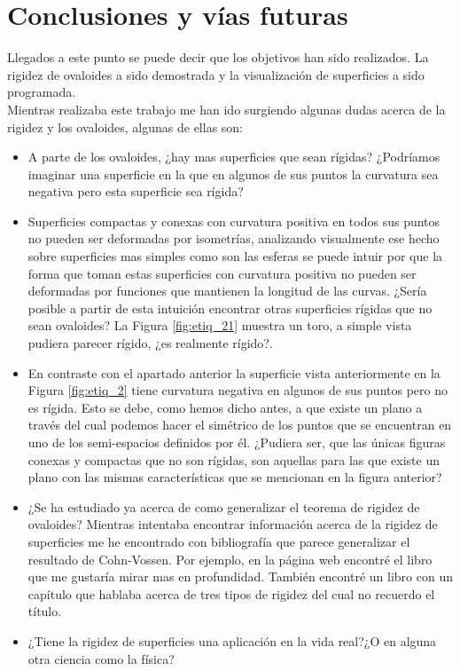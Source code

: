 \chapter*{Conclusiones y vías futuras}

Llegados a este punto se puede decir que los objetivos han sido realizados. La rigidez de ovaloides a sido demostrada y la visualización de superficies a sido programada.
${ }$\\

Mientras realizaba este trabajo me han ido surgiendo algunas dudas acerca de la rigidez y los ovaloides, algunas de ellas son: 
${ }$\\

\begin{itemize}
	\item A parte de los ovaloides, ¿hay mas superficies que sean rígidas? ¿Podríamos imaginar una superficie en la que en algunos de sus puntos la curvatura sea negativa pero esta superficie sea rígida?
	
	\item Superficies compactas y conexas con curvatura positiva en todos sus puntos no pueden ser deformadas por isometrías, analizando visualmente ese hecho sobre superficies mas simples como son las esferas se puede intuir por que la forma que toman estas superficies con curvatura positiva no pueden ser deformadas por funciones que mantienen la longitud de las curvas. ¿Sería posible a partir de esta intuición encontrar otras superficies rígidas que no sean ovaloides? La Figura \ref{fig:etiq_21} muestra un toro, a simple vista pudiera parecer rígido, ¿es realmente rígido?.
	
	\item En contraste con el apartado anterior la superficie vista anteriormente en la Figura \ref{fig:etiq_2} tiene curvatura negativa en algunos de sus puntos pero no es rígida. Esto se debe, como hemos dicho antes, a que existe un plano a través del cual podemos hacer el simétrico de los puntos que se encuentran en uno de los semi-espacios definidos por él. ¿Pudiera ser, que las únicas figuras conexas y compactas que no son rígidas, son aquellas para las que existe un plano con las mismas características que se mencionan en la figura anterior?
	
	\item ¿Se ha estudiado ya acerca de como generalizar el teorema de rigidez de ovaloides? Mientras intentaba encontrar información acerca de la rigidez de superficies me he encontrado con bibliografía que parece generalizar el resultado de Cohn-Vossen. Por ejemplo, en la página web \cite{ref7} encontré el libro \cite{math1} que me gustaría mirar mas en profundidad. También encontré un libro con un capítulo que hablaba acerca de tres tipos de rigidez del cual no recuerdo el título.
	
	\item ¿Tiene la rigidez de superficies una aplicación en la vida real?¿O en alguna otra ciencia como la física?
\end{itemize}
${ }$\\

